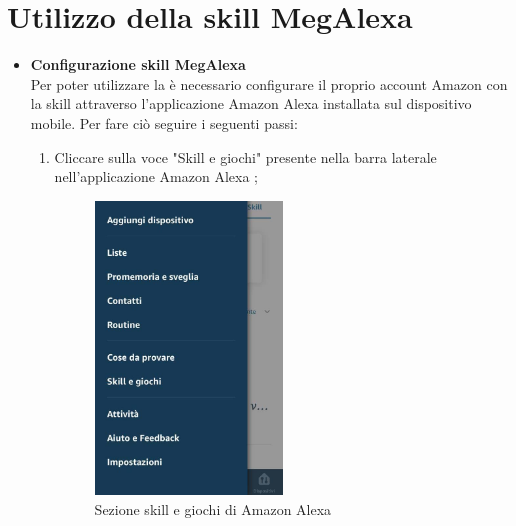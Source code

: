 \section{Utilizzo della skill MegAlexa}
\label{Utilizzo skill}
\begin{itemize}
\item  \textbf{Configurazione skill MegAlexa}\\
\label{Configurazione MegAlexa}
Per poter utilizzare la   è necessario configurare il proprio account Amazon con la skill  attraverso l'applicazione Amazon Alexa installata sul dispositivo mobile. Per fare ciò seguire i seguenti passi:
\begin{enumerate}
	\item  Cliccare sulla voce "Skill e giochi"  presente nella barra laterale nell'applicazione Amazon Alexa ;
	
	\begin{figure}[!ht]
		\centering
		\includegraphics[width=0.5\textwidth]{images/SkillGiochi.png}
		\caption{Sezione skill e giochi di Amazon Alexa}
	\end{figure}
\newpage
	

\end{enumerate}
\end{itemize}
